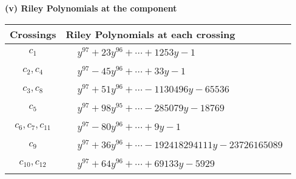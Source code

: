 \documentclass[1p]{elsarticle_modified}
\theoremstyle{definition}
\begin{document}
\newpage\renewcommand{\arraystretch}{1}
\flushleft \textbf{(v) Riley Polynomials at the component}\newline \\
\begin{tabular}{m{50pt}|m{274pt}}
Crossings & \hspace{64pt}Riley Polynomials at each crossing \\
\hline $$\begin{aligned}c_{1}\end{aligned}$$&$\begin{aligned}
&y^{97}+23 y^{96}+\cdots+1253 y-1
\end{aligned}$\\
\hline $$\begin{aligned}c_{2},c_{4}\end{aligned}$$&$\begin{aligned}
&y^{97}-45 y^{96}+\cdots+33 y-1
\end{aligned}$\\
\hline $$\begin{aligned}c_{3},c_{8}\end{aligned}$$&$\begin{aligned}
&y^{97}+51 y^{96}+\cdots-1130496 y-65536
\end{aligned}$\\
\hline $$\begin{aligned}c_{5}\end{aligned}$$&$\begin{aligned}
&y^{97}+98 y^{95}+\cdots-285079 y-18769
\end{aligned}$\\
\hline $$\begin{aligned}c_{6},c_{7},c_{11}\end{aligned}$$&$\begin{aligned}
&y^{97}-80 y^{96}+\cdots+9 y-1
\end{aligned}$\\
\hline $$\begin{aligned}c_{9}\end{aligned}$$&$\begin{aligned}
&y^{97}+36 y^{96}+\cdots-192418294111 y-23726165089
\end{aligned}$\\
\hline $$\begin{aligned}c_{10},c_{12}\end{aligned}$$&$\begin{aligned}
&y^{97}+64 y^{96}+\cdots+69133 y-5929
\end{aligned}$\\
\hline
\end{tabular}\\~\\
\end{document}
